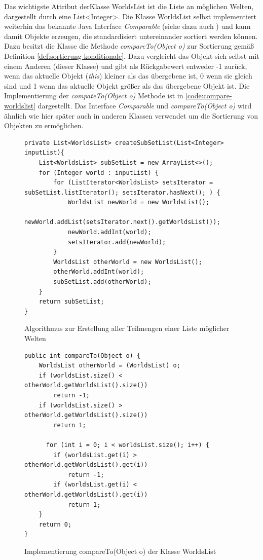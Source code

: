 \documentclass[12pt,a4paper]{article}
\begin{document}
Das wichtigste Attribut derKlasse WorldsList ist die Liste an möglichen Welten, dargestellt durch eine List<Integer>. Die Klasse WorldsList selbst implementiert weiterhin das bekannte Java Interface  \textit{Comparable} (siehe dazu auch \cite{oracle2019}) und kann damit Objekte erzeugen, die standardisiert untereinander sortiert werden können. Dazu besitzt die Klasse die Methode \textit{compareTo(Object o)} zur Sortierung gemäß Definition \ref{def:sortierung-konditionale}. Dazu vergleicht das Objekt sich selbst mit einem Anderen (dieser Klasse) und gibt als Rückgabewert entweder -1 zurück, wenn das aktuelle  Objekt (\textit{this}) kleiner als das übergebene ist, 0 wenn sie gleich sind und 1 wenn das aktuelle Objekt größer als das übergebene Objekt ist. Die Implementierung der \textit{compateTo(Object o)} Methode ist in \autoref{code:compare-worldslist} dargestellt. Das Interface  \textit{Comparable} und \textit{compareTo(Object o)} wird ähnlich wie hier später auch in anderen Klassen verwendet um die Sortierung von Objekten zu ermöglichen.



\begin{figure}
\begin{lstlisting}
private List<WorldsList> createSubSetList(List<Integer> inputList){
    List<WorldsList> subSetList = new ArrayList<>();
    for (Integer world : inputList) {
        for (ListIterator<WorldsList> setsIterator = subSetList.listIterator(); setsIterator.hasNext(); ) {
            WorldsList newWorld = new WorldsList();
            newWorld.addList(setsIterator.next().getWorldsList());
            newWorld.addInt(world);
            setsIterator.add(newWorld);
        }
        WorldsList otherWorld = new WorldsList();
        otherWorld.addInt(world);
        subSetList.add(otherWorld);
    }
    return subSetList;
}
\end{lstlisting}
\caption{Algorithmus zur Erstellung aller Teilmengen einer Liste möglicher Welten}
\label{code:subsets}
\end{figure}



\begin{figure}
\begin{lstlisting}
public int compareTo(Object o) {
    WorldsList otherWorld = (WorldsList) o;
    if (worldsList.size() < otherWorld.getWorldsList().size())
        return -1;
    if (worldsList.size() > otherWorld.getWorldsList().size())
        return 1;
          
      for (int i = 0; i < worldsList.size(); i++) {
        if (worldsList.get(i) > otherWorld.getWorldsList().get(i))
            return -1;
        if (worldsList.get(i) < otherWorld.getWorldsList().get(i))
            return 1;
    }
    return 0;
}
\end{lstlisting}
\caption{Implementierung compareTo(Object o) der Klasse WorldsList}
\label{code:compare-worldslist}
\end{figure}
\end{document}
